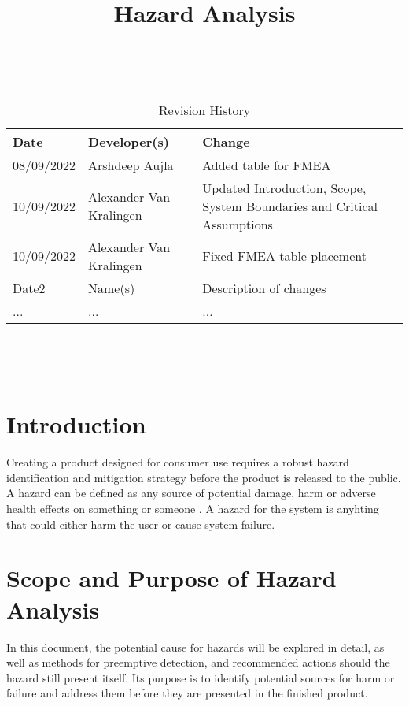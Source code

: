 \documentclass{article}
\title{Hazard Analysis\\\progname}
\author{\authname}
\date{}
\begin{document}
\maketitle
\thispagestyle{empty}

~\newpage


\begin{table}[hp]
\caption{Revision History} \label{TblRevisionHistory}
\begin{tabularx}{\textwidth}{llX}
\toprule
\textbf{Date} & \textbf{Developer(s)} & \textbf{Change}\\
\midrule
08/09/2022 & Arshdeep Aujla & Added table for FMEA\\
10/09/2022 & Alexander Van Kralingen & Updated Introduction, Scope, System Boundaries and Critical Assumptions\\
10/09/2022 & Alexander Van Kralingen & Fixed FMEA table placement\\
Date2 & Name(s) & Description of changes\\
... & ... & ...\\
\bottomrule
\end{tabularx}
\end{table}

~\newpage

\tableofcontents

~\newpage



\section{Introduction}{
    Creating a product designed for consumer use requires a robust hazard identification and mitigation strategy before the product is released to the public. A hazard can be defined as any source of potential damage, harm or adverse health effects on something or someone \cite{CCOHS}. A hazard for the \progname{} system is anyhting that could either harm the user or cause system failure.
}

\section{Scope and Purpose of Hazard Analysis}{
    In this document, the potential cause for hazards will be explored in detail, as well as methods for preemptive detection, and recommended actions should the hazard still present itself. Its purpose is to identify potential sources for harm or failure and address them before they are presented in the finished product.
}
\end{document}
